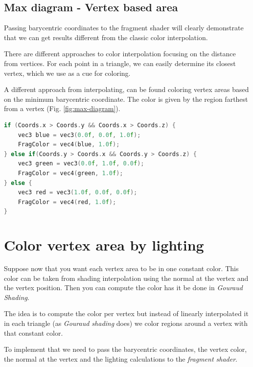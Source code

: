 \subsection{Max diagram - Vertex based area} \label{section:max-diagram}
Passing barycentric coordinates to the fragment shader will clearly demonstrate that we can get results different from the classic color interpolation.

There are different approaches to color interpolation focusing on the distance from vertices. For each point in a triangle, we can easily determine its closest vertex, which we use as a cue for coloring.

A different approach from interpolating, can be found coloring vertex areas based on the minimum barycentric coordinate.
The color is given by the region farthest from a vertex (Fig. \ref{fig:max-diagram}).

\begin{lstlisting}[language=C++,
    directivestyle={\color{black}}
    emph={int,char,double,float,unsigned},
    emphstyle={\color{blue}}
   ]
if (Coords.x > Coords.y && Coords.x > Coords.z) {
    vec3 blue = vec3(0.0f, 0.0f, 1.0f);
    FragColor = vec4(blue, 1.0f);
} else if(Coords.y > Coords.x && Coords.y > Coords.z) {
    vec3 green = vec3(0.0f, 1.0f, 0.0f);
    FragColor = vec4(green, 1.0f);
} else {
    vec3 red = vec3(1.0f, 0.0f, 0.0f);
    FragColor = vec4(red, 1.0f);
}
\end{lstlisting}

\section{Color vertex area by lighting}
Suppose now that you want each vertex area to be in one constant color. This color can be taken from shading interpolation using the normal at the vertex and the vertex position. Then you can compute the color has it be done in \textit{Gouraud Shading}.

The idea is to compute the color per vertex but instead of linearly interpolated it in each triangle (as \textit{Gouraud shading} does) we color regions around a vertex with that constant color.

To implement that we need to pass the barycentric coordinates, the vertex color, the normal at the vertex and the lighting calculations to the \textit{fragment shader}.

